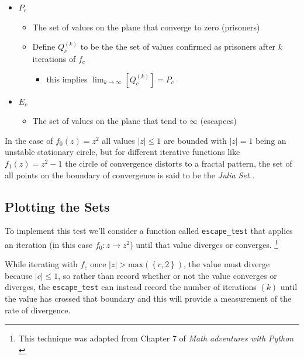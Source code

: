 \documentclass[a4paper,11pt,twoside]{article}
\begin{document}
\begin{itemize}
\item \(P_{c}\)
\begin{itemize}
\item The set of values on the plane that converge to zero (prisoners)
\item Define \(Q^{(k)}_{c}\) to be the the set of values confirmed as prisoners after \(k\) iterations of \(f_{c}\)
\begin{itemize}
\item this implies \(\lim_{k \rightarrow \infty} \left[ Q^{(k)}_{c}  \right] = P_{c}\)
\end{itemize}
\end{itemize}
\item \(E_{c}\)
\begin{itemize}
\item The set of values on the plane that tend to \(\infty\) (escapees)
\end{itemize}
\end{itemize}

In the case of \(f_{0}(z) = z^{2}\) all values \(\left\lvert z  \right \rvert \leq 1\) are bounded with \(\left\lvert z  \right \rvert = 1\) being an unstable stationary circle, but for different iterative functions like \(f_{1}(z) = z^{2} - 1\) the circle of convergence distorts to a fractal pattern, the set of all points on the boundary of convergence is said to be the \emph{Julia Set} \cite[Ch. 14]{peitgenChaosFractalsNew2004}.

\subsection{Plotting the Sets}
\label{sec:org2fdb888}
To implement this test we'll consider a function called \texttt{escape\_test} that applies an
iteration (in this case \(f_{0}: z \rightarrow z^{2}\)) until that value diverges or converges. \footnote{This technique was adapted from Chapter 7 of \emph{Math adventures with Python} \cite{farrellMathAdventuresPython2019}}

While iterating with \(f_{c}\) once \(\left\lvert z \right\rvert >
\mathrm{max}\left(\left\{c, 2\right\}\right)\), the value must diverge because
\(\left\lvert c \right\rvert \leq 1\), so rather than record whether or not the
value converges or diverges, the \texttt{escape\_test} can instead record the number of
iterations \((k)\) until the value has crossed that boundary and this will provide
a measurement of the rate of divergence.
\end{document}
